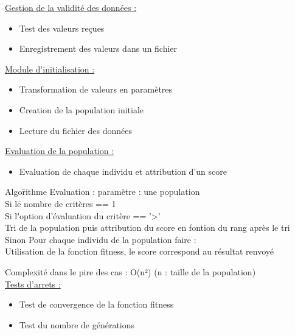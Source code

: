 \documentclass[a4paper,11pt]{article}
\begin{document}
		\underline{Gestion de la validité des données : }
		\begin{itemize}
			\item Test des valeurs reçues
			\item Enregistrement des valeurs dans un fichier\\
		\end{itemize}
		
		\underline{Module d'initialisation : }
		\begin{itemize}
			\item Transformation de valeurs en paramètres
			\item Creation de la population initiale
			\item Lecture du fichier des données\\
		\end{itemize}
	
		\underline{Evaluation de la population : }
		\begin{itemize}
			\item Evaluation de chaque individu et attribution d'un score
		\end{itemize}
		\begin{tabbing} 
		Algo\=rithme Evaluation : paramètre : une population\\
			\>Si l\=e nombre de critères == 1\\
			\>	\>Si l\='option d'évaluation du critère == '>'\\
			\>	\>	\>Tri de la population puis attribution du score en fontion du rang après le tri\\
			\>Sinon
			\>	\>Pour chaque individu de la population faire :\\
			\>	\>	\>Utilisation de la fonction fitness, le score correspond au résultat renvoyé
		\end{tabbing}
		Complexité dans le pire des cas : O(n²) (n : taille de la population)\\
		
		\underline{Tests d'arrets : }
		\begin{itemize}
			\item Test de convergence de la fonction fitness
			\item Test du nombre de générations\\
		\end{itemize}
\end{document}
